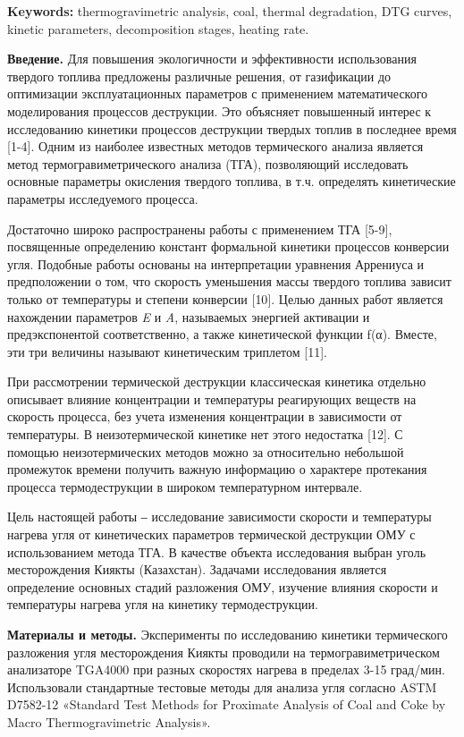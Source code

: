 {\bfseries Keywords:} thermogravimetric analysis, coal, thermal
degradation, DTG curves, kinetic parameters, decomposition stages,
heating rate.

\begin{multicols}{2}
{\bfseries Введение.} Для повышения экологичности и эффективности
использования твердого топлива предложены различные решения, от
газификации до оптимизации эксплуатационных параметров с применением
математического моделирования процессов деструкции. Это объясняет
повышенный интерес к исследованию кинетики процессов деструкции твердых
топлив в последнее время {[}1-4{]}. Одним из наиболее известных методов
термического анализа является метод термогравиметрического анализа
(ТГА), позволяющий исследовать основные параметры окисления твердого
топлива, в т.ч. определять кинетические параметры исследуемого процесса.

Достаточно широко распространены работы с применением ТГА {[}5-9{]},
посвященные определению констант формальной кинетики процессов конверсии
угля. Подобные работы основаны на интерпретации уравнения Аррениуса и
предположении о том, что скорость уменьшения массы твердого топлива
зависит только от температуры и степени конверсии {[}10{]}. Целью данных
работ является нахождении параметров \emph{E} и \emph{A}, называемых
энергией активации и предэкспонентой соответственно, а также
кинетической функции f(α). Вместе, эти три величины называют
кинетическим триплетом {[}11{]}.

При рассмотрении термической деструкции классическая кинетика отдельно
описывает влияние концентрации и температуры реагирующих веществ на
скорость процесса, без учета изменения концентрации в зависимости от
температуры. В неизотермической кинетике нет этого недостатка {[}12{]}.
С помощью неизотермических методов можно за относительно небольшой
промежуток времени получить важную информацию о характере протекания
процесса термодеструкции в широком температурном интервале.

Цель настоящей работы ‒ исследование зависимости скорости и температуры
нагрева угля от кинетических параметров термической деструкции ОМУ с
использованием метода ТГА. В качестве объекта исследования выбран уголь
месторождения Киякты (Казахстан). Задачами исследования является
определение основных стадий разложения ОМУ, изучение влияния скорости и
температуры нагрева угля на кинетику термодеструкции.

{\bfseries Материалы и методы.} Эксперименты по исследованию кинетики
термического разложения угля месторождения Киякты проводили на
термогравиметрическом анализаторе TGA4000 при разных скоростях нагрева в
пределах 3-15 град/мин. Использовали стандартные тестовые методы для
анализа угля согласно ASTM D7582-12 «Standard Test Methods for Proximate
Analysis of Coal and Coke by Macro Thermogravimetric Analysis».


\end{multicols}
